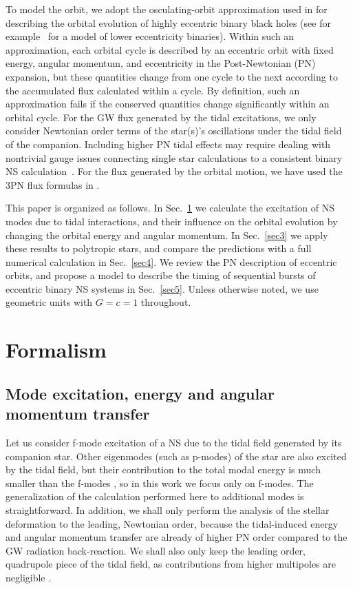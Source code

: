 \documentclass[prd,aps,floatfix,superscriptaddress,nofootinbib,twocolumn,10pt,English]{revtex4}
\begin{document}
To  model the orbit, we adopt the osculating-orbit
approximation used in \cite{loutrel2017eccentric} for describing the
orbital evolution of highly eccentric binary black holes   (see
for example~\cite{Huerta:2016rwp} for a model of lower eccentricity
binaries). Within such an approximation, each orbital cycle is
described by an eccentric orbit with fixed energy, angular momentum,
and eccentricity in the Post-Newtonian (PN) expansion, but these quantities
change from one cycle to the next according to the accumulated flux calculated
within a cycle. By definition, such an approximation fails if the conserved quantities change significantly within an orbital cycle. For the GW flux generated by the tidal excitations, we
only consider Newtonian order terms of the star(s)'s oscillations
under the tidal field of the companion. Including higher PN tidal
effects may require dealing with nontrivial gauge issues
connecting single star calculations to a consistent binary NS
calculation~\cite{gralla2018ambiguity}. For the flux generated by the
orbital motion, we have used the 3PN flux formulas in
\cite{blanchet2014gravitational, loutrel2017eccentric}.

This paper is organized as follows. In Sec.~\ref{sec2} we 
calculate the excitation of NS modes due to tidal interactions, and
their influence on the orbital evolution by changing the orbital energy and
angular momentum. In Sec.~\ref{sec3} we apply these results to polytropic stars,
and compare the predictions with a full numerical calculation in Sec.~\ref{sec4}. We
review the PN description of eccentric orbits, and propose a model to describe
the timing of sequential bursts of eccentric binary NS systems in
Sec.~\ref{sec5}. 
Unless otherwise noted, we use geometric units with $G=c=1$ throughout.

\section{Formalism}\label{sec2}

\subsection{Mode excitation, energy and angular momentum transfer}

Let us consider f-mode excitation of a NS due to the tidal field
generated by its companion star. Other eigenmodes
(such as p-modes) of the star are also excited by the tidal field, but
their contribution to the total modal energy is much smaller than the
f-modes \cite{press1977formation}, so in this work we focus only on
f-modes. The generalization of the calculation performed here to
additional modes is straightforward. In addition, we shall only
perform the analysis of the stellar deformation to the leading,
Newtonian order, because the tidal-induced energy and angular momentum
transfer are already of higher PN order compared to the GW radiation
back-reaction.  We shall also only keep the leading order, quadrupole
piece of the tidal field, as contributions from higher multipoles are
negligible \cite{press1977formation}.
\end{document}
